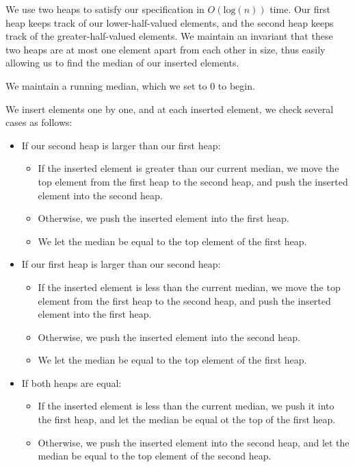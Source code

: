 \documentclass[letterpaper,12pt]{article}
\begin{document}
We use two heaps to satisfy our specification in $O( \mathrm{log}(n))$ time.
Our first heap keeps track of our lower-half-valued elements, and the second heap keeps track of the
greater-half-valued elements. We maintain an invariant that these two heaps are at most one element
apart from each other in size, thus easily allowing us to find the median of our inserted elements.



We maintain a running median, which we set to 0 to begin.


We insert elements one by one, and at each inserted element, we check several cases as follows:


\begin{itemize}
    \item If our second heap is larger than our first heap:
        \begin{itemize}
            \item If the inserted element is greater than our current median, we move the top element
                from the first heap to the second heap, and push the inserted element into the second heap.
            \item Otherwise, we push the inserted element into the first heap.
            \item We let the median be equal to the top element of the first heap.
        \end{itemize}
    \item If our first heap is larger than our second heap:
        \begin{itemize}
            \item If the inserted element is less than the current median, we move the top element
                from the first heap to the second heap, and push the inserted element into the first heap.
            \item Otherwise, we push the inserted element into the second heap.
            \item We let the median be equal to the top element of the first heap.
        \end{itemize}
    \item If both heaps are equal:
        \begin{itemize}
            \item If the inserted element is less than the current median, we push it into the first heap,
                and let the median be equal ot the top of the first heap.
            \item Otherwise, we push the inserted element into the second heap, and let
                the median be equal to the top element of the second heap.
        \end{itemize}
\end{itemize}
\end{document}
